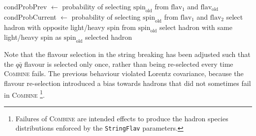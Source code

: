 \documentclass[12pt,a4paper]{report}
\begin{document}
\begin{algorithm}
  \caption{High level description of the algorithm to combine quark flavours with conditional spin flipping}
  \label{alg:conditional-combine}
  \begin{algorithmic}
      \State condProbPrev $\gets$ probability of selecting $\text{spin}_\text{old}$ from $\text{flav}_1$ and $\text{flav}_\text{old}$
      \State condProbCurrent $\gets$ probability of selecting $\text{spin}_\text{old}$ from $\text{flav}_1$ and $\text{flav}_2$
        \State select hadron with opposite light/heavy spin from $\text{spin}_\text{old}$
      \Else
        \State select hadron with same light/heavy spin as $\text{spin}_\text{old}$
      \EndIf
      \State \Return selected hadron
    \EndProcedure
  \end{algorithmic}
\end{algorithm}

Note that the flavour selection in the string breaking has been adjusted such that the $q\bar{q}$ flavour is selected only once, rather than being re-selected every time \textsc{Combine} fails. The previous behaviour violated Lorentz covariance, because the flavour re-selection introduced a bias towards hadrons that did not sometimes fail in \textsc{Combine} \footnote{Failures of \textsc{Combine} are intended effects to produce the hadron species distributions enforced by the \texttt{StringFlav} parameters.}.
\end{document}
